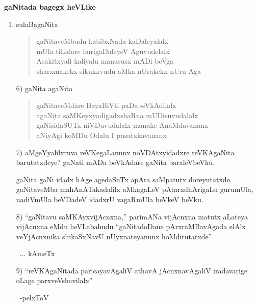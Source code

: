 \begin{center}
{\bf gaNitada bagegx heVLike} 
\end{center}
\begin{enumerate}[\rm 5)]
\item sulaBagaNita
\begin{center} 
\begin{verse}
gaNitaveMbudu kabibxNada kaDaleyalalx\\
mUla tiLidare hurigaDaleyeV Aguvudelalx\\
Asakitxyali kaliyalu manasusx mADi beVga\\
sharxmakekx sikukxvudu aMka nUrakekx nUru Aga
\end{verse}
\end{center}

\item[\rm 6)] gaNita agaNita
\begin{center} 
\begin{verse}
gaNitaveMdare BayaBiVti paDabeVkAdilalx\\
agaNita saMKeyxyadigadxshaRna mUDisuvudalalx\\
gaNisidaSUTx niVDuvudalalx manake AnaMdavananx\\
aNiyAgi koMDu Odalu I pusatxkavananx
\end{verse}
\end{center}

\item[\rm 7)] aMgeYyalilxruva reVKegaLanunx noVDAtxyidadxre reVKAgaNita barutatxdeye? gaNati mADa beVkAdare gaNita baraleVbeVku.

gaNita gaNi idadx hAge agedaSuTx apAra saMpatutx doreyutatxde. gaNitaveMba mahAnATakadalilx aMkagaLeV pAtarxdhArigaLu gurumUla, nadiVmUla beVDadeV idadxrU vagaRmUla beVkeV beVku.

\item[\rm 8)]  ``gaNitavu saMKAyxvijAcnxna,'' parimANa vijAcnxna matutx aLateya vijAcnxna eMdu heVLabahudu ``gaNitadoDane pArxraMBavAgada elAlx veYjAcnxnika shikaSxNavU nUyxnateyanunx hoMdirutatxde''

~\hfill $\ldots$  kAmeTx

\item[\rm 9)] ``reVKAgaNitada paricayavAgaliV athavA jAcnxnavAgaliV iradavarige oLage parxveVshavilalx''

~\hfill -pelxToV
\end{enumerate}
